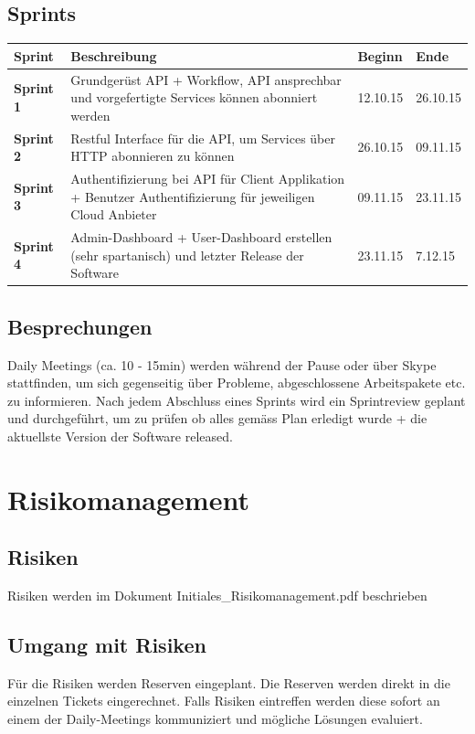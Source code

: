 \documentclass[11pt]{scrartcl}
\begin{document}
\subsection{Sprints}
\begin{tabularx}{\textwidth}{l X l l}
\textbf{Sprint} & \textbf{Beschreibung} & \textbf{Beginn} &  \textbf{Ende} \\
\hline
\textbf{Sprint 1} & Grundgerüst API + Workflow, API ansprechbar und vorgefertigte Services können 
abonniert werden  & 12.10.15 & 26.10.15 \\
\hline
\textbf{Sprint 2} & Restful Interface für die API, um Services über HTTP 
abonnieren zu können
& 26.10.15 & 09.11.15 \\
\hline
\textbf{Sprint 3} & Authentifizierung bei API für Client Applikation + Benutzer Authentifizierung 
für jeweiligen Cloud Anbieter & 09.11.15 & 23.11.15 \\
\hline
\textbf{Sprint 4} & Admin-Dashboard + User-Dashboard erstellen (sehr spartanisch) 
und letzter Release der Software
& 23.11.15 & 7.12.15 \\
\hline
\end{tabularx}

\subsection{Besprechungen}
Daily Meetings (ca. 10 - 15min) werden während der Pause oder über Skype stattfinden, um sich 
gegenseitig über Probleme, abgeschlossene Arbeitspakete etc. zu informieren.
Nach jedem Abschluss eines Sprints wird ein Sprintreview geplant und durchgeführt, um zu prüfen 
ob alles gemäss Plan erledigt wurde + die aktuellste Version der Software 
released.
\section{Risikomanagement}
\subsection{Risiken}
Risiken werden im Dokument Initiales\_Risikomanagement.pdf beschrieben
\subsection{Umgang mit Risiken}
Für die Risiken werden Reserven eingeplant. Die Reserven werden direkt in die einzelnen Tickets 
eingerechnet. Falls Risiken eintreffen werden diese sofort an einem der Daily-Meetings kommuniziert 
und mögliche Lösungen evaluiert.
\end{document}
